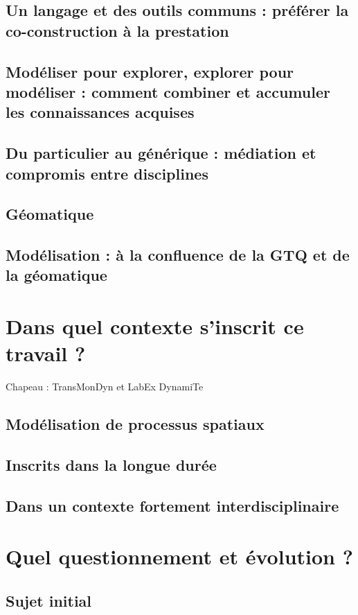 \begin{itemize}
\subsection{Un langage et des outils communs : préférer la co-construction à la prestation}
\subsection{Modéliser pour explorer, explorer pour modéliser : comment combiner et accumuler les connaissances acquises}
\subsection{Du particulier au générique : médiation et compromis entre disciplines}
\subsection{Géomatique}

\subsection{Modélisation : à la confluence de la GTQ et de la géomatique}
\section{Dans quel contexte s'inscrit ce travail ?}

Chapeau : TransMonDyn et LabEx DynamiTe

\subsection{Modélisation de processus spatiaux}

\subsection{Inscrits dans la longue durée}

\subsection{Dans un contexte fortement interdisciplinaire}


\section{Quel questionnement et évolution ?}

\subsection{Sujet initial}


\end{itemize}
